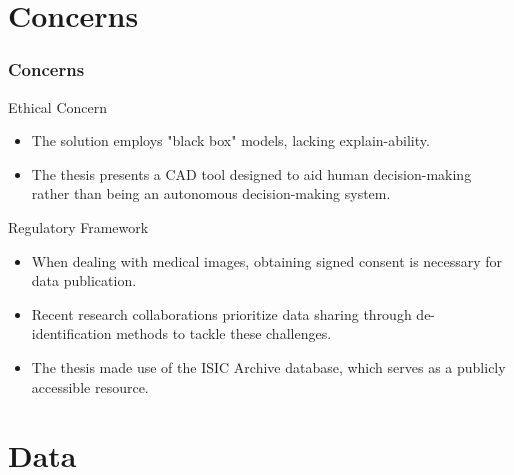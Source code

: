 \documentclass[dvipsnames,mathserif]{beamer}
\begin{document}
{\begin{frame}
    \end{frame}





    \section{Concerns}


    \begin{frame}
      \frametitle{Concerns}
    \end{frame}

    \begin{frame}
      \large Ethical Concern
      \vspace{0.25cm}

      \footnotesize
      \begin{itemize}
        \item The solution employs "black box" models, lacking explain-ability.
        \item The thesis presents a CAD tool designed to aid human decision-making
          rather than being an autonomous decision-making system.
      \end{itemize}
    \end{frame}

    \begin{frame}

      \large Regulatory Framework
      \vspace{0.25cm}

      \footnotesize

      \begin{itemize}
        \item When dealing with medical images, obtaining signed consent is
          necessary for data publication.
        \item Recent research collaborations prioritize data sharing through
          de-identification methods to tackle these challenges.
        \item The thesis made use of the ISIC Archive database, which serves as
          a publicly accessible resource.
      \end{itemize}


    \end{frame}



    \section{Data}

}
\end{document}
